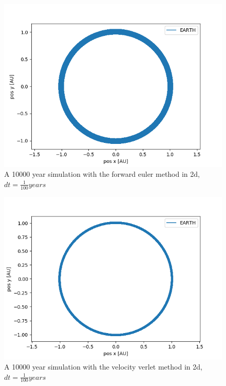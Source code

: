\documentclass[a4paper]{article}
\begin{document}
\begin{figure}[h!]
	\centering 
	\includegraphics[scale=0.7]{fe1e4_2d.png}
	\caption{A 10000 year simulation with the forward euler method in 2d, $dt = \frac{1}{100}years$}
	\label{fe2d}
\end{figure}

\begin{figure}[h!]
	\centering 
	\includegraphics[scale=0.7]{vv1e4_2d.png}
	\caption{A 10000 year simulation with the velocity verlet method in 2d, $dt = \frac{1}{100}years$}
	\label{vv2d}
\end{figure}
\end{document}
